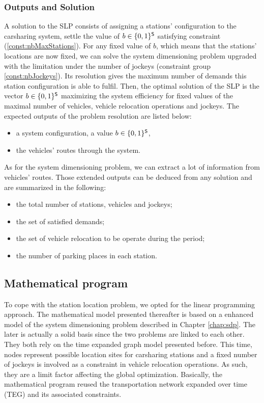 \begin{bibunit}[ieeetr]
\subsubsection{Outputs and Solution}
A solution to the SLP consists of assigning a stations' configuration to the carsharing system, \ie settle the value of $b \in \{0, 1\}^{\mathsf{S}}$ satisfying constraint (\ref{const:nbMaxStations}).
For any fixed value of $b$, which means that the stations' locations are now fixed, we can solve the system dimensioning problem upgraded with the limitation under the number of jockeys (constraint group \ref{const:nbJockeys}).
Its resolution gives the maximum number of demands this station configuration is able to fulfil.
Then, the optimal solution of the SLP is the vector $b \in \{0, 1\}^{\mathsf{S}}$ maximizing the system efficiency for fixed values of the maximal number of vehicles, vehicle relocation operations and jockeys.
The expected outputs of the problem resolution are listed below:
\begin{itemize}
\item a system configuration, \ie a value $b \in \{0, 1\}^{\mathsf{S}}$,
\item the vehicles' routes through the system.
\end{itemize}

\medskip
As for the system dimensioning problem, we can extract a lot of information from vehicles' routes.
Those extended outputs can be deduced from any solution and are summarized in the following:
\begin{itemize}
\item the total number of stations, vehicles and jockeys;
\item the set of satisfied demands;
\item the set of vehicle relocation to be operate during the period;
\item the number of parking places in each station.
\end{itemize}

\subsection{Mathematical program}
To cope with the station location problem, we opted for the linear programming approach.
The mathematical model presented thereafter is based on a enhanced model of the system dimensioning problem described in Chapter \ref{chap:sdp}.
The later is actually a solid basis since the two problems are linked to each other.
They both rely on the time expanded graph model presented before.
This time, nodes represent possible location sites for carsharing stations and a fixed number of jockeys is involved as a constraint in vehicle relocation operations.
As such, they are a limit factor affecting the global optimization.
Basically, the mathematical program reused the transportation network expanded over time (TEG) and its associated constraints.


\end{bibunit}
